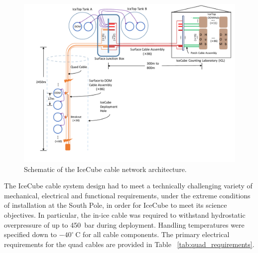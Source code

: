 \begin{figure}
  \centering
  \includegraphics[width=\textwidth]{graphics/cables/cable_system_schematic.pdf}
  \caption{\label{fig:icecube-cables-logical}Schematic of the IceCube cable network architecture.}
\end{figure}

The IceCube cable system design had to meet a technically challenging
variety of mechanical, electrical and functional requirements, under the extreme
conditions of installation at the South Pole, in order for
IceCube to meet its science objectives.  In particular, the in-ice cable
was required to withstand hydrostatic overpressure of up to 450~bar during
deployment.  Handling temperatures were specified down to $-40^{\circ}\ \mathrm{C}$ for all 
cable components.  The primary electrical requirements for the quad
cables are provided in Table ~\ref{tab:quad_requirements}.

